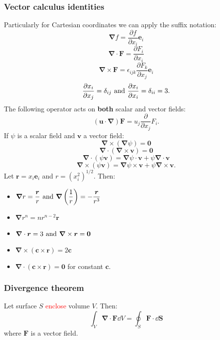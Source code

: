 \documentclass{article}
\newcommand{\vc}[1]{\boldsymbol{#1}}
\begin{document}
\begin{multicols*}{3}
\subsubsection*{Vector calculus identities}
Particularly for Cartesian coordinates
we can apply the suffix notation:
$$\vc{\nabla}f=
\frac{\partial f}{\partial x_i}\vc{e}_i$$
$$\vc{\nabla}\cdot\vc{F}=
\frac{\partial F_i}{\partial x_i}$$
$$\vc{\nabla}\times\vc{F}
=\epsilon_{ijk}\frac{\partial F_k}{\partial x_j}
\vc{e}_i$$
$$\frac{\partial x_i}{\partial x_j}=\delta_{ij}
\hspace{0.05in}\text{and}\hspace{0.05in}
\frac{\partial x_i}{\partial x_i}=\delta_{ii}=3.$$
The following operator acts on \textbf{both} scalar and vector fields:
$$(\vc{u}\cdot\vc{\nabla})\vc{F}
=u_j\frac{\partial}{\partial x_j}F_i.$$
If $\psi$ is a scalar field and $\vc{v}$ a vector field:
$$\vc{\nabla}\times(\vc{\nabla}\psi)=\vc{0}$$
$$\vc{\nabla}\cdot(\vc{\nabla}\times\vc{v})=\vc{0}$$
$$\vc{\nabla}\cdot(\psi\vc{v})
=\vc{\nabla}\psi\cdot\vc{v}+\psi\vc{\nabla}\cdot\vc{v}$$
$$\vc{\nabla}\times(\psi\vc{v})
=\vc{\nabla}\psi\times\vc{v}+\psi\vc{\nabla}\times\vc{v}.$$
Let $\vc{r}=x_i\vc{e}_i$ and $r=(x_i^2)^{1/2}$. Then:
\begin{itemize}
    \item $\displaystyle\vc{\nabla}r=\frac{\vc{r}}{r}
    \hspace{0.05in}\text{and}\hspace{0.05in}
    \vc{\nabla}\left(\frac{1}{r}\right)
    =-\frac{\vc{r}}{r^3}$
    
    \item $\displaystyle\vc{\nabla}r^n
    =n r^{n-2}\vc{r}$
    
    \item $\displaystyle\vc{\nabla}\cdot\vc{r}=3
    \hspace{0.05in}\text{and}\hspace{0.05in}
    \vc{\nabla}\times\vc{r}=\vc{0}$

    \item $\displaystyle\vc{\nabla}\times
    (\vc{c}\times\vc{r})=2\vc{c}$
    
    \item $\displaystyle\vc{\nabla}
    \cdot(\vc{c}\times\vc{r})=\vc{0}$
    for constant $\vc{c}$.
\end{itemize}

\subsubsection*{Divergence theorem}
Let surface $S$ \textcolor{red}{enclose} volume $V$. Then:
$$\int_V \vc{\nabla}\cdot\vc{F}\dd V
=\oint_S \vc{F}\cdot\dd\vc{S}$$
where $\vc{F}$ is a vector field.


\end{multicols*}
\end{document}
